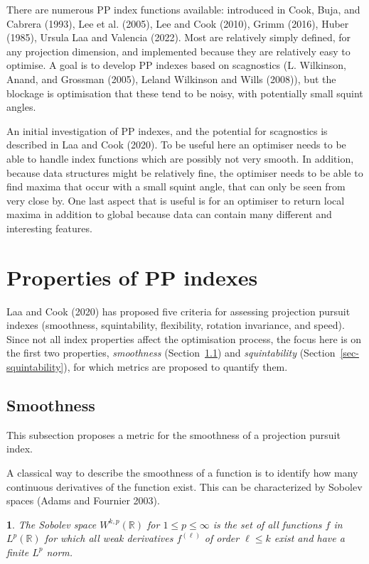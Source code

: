 \documentclass[
  12pt,
]{interact}
\theoremstyle{plain}
\newtheorem{defn}{\protect\definitionname}
\providecommand{\definitionname}{Definition}
\begin{document}
There are numerous PP index functions available: introduced in Cook,
Buja, and Cabrera (1993), Lee et al. (2005), Lee and Cook (2010), Grimm
(2016), Huber (1985), Ursula Laa and Valencia (2022). Most are
relatively simply defined, for any projection dimension, and implemented
because they are relatively easy to optimise. A goal is to develop PP
indexes based on scagnostics (L. Wilkinson, Anand, and Grossman (2005),
Leland Wilkinson and Wills (2008)), but the blockage is optimisation
that these tend to be noisy, with potentially small squint angles.

An initial investigation of PP indexes, and the potential for
scagnostics is described in Laa and Cook (2020). To be useful here an
optimiser needs to be able to handle index functions which are possibly
not very smooth. In addition, because data structures might be
relatively fine, the optimiser needs to be able to find maxima that
occur with a small squint angle, that can only be seen from very close
by. One last aspect that is useful is for an optimiser to return local
maxima in addition to global because data can contain many different and
interesting features.

\section{Properties of PP indexes}\label{sec-PP-properties}

Laa and Cook (2020) has proposed five criteria for assessing projection
pursuit indexes (smoothness, squintability, flexibility, rotation
invariance, and speed). Since not all index properties affect the
optimisation process, the focus here is on the first two properties,
\emph{smoothness} (Section~\ref{sec-smoothness}) and
\emph{squintability} (Section~\ref{sec-squintability}), for which
metrics are proposed to quantify them.

\subsection{Smoothness}\label{sec-smoothness}

This subsection proposes a metric for the smoothness of a projection
pursuit index.

A classical way to describe the smoothness of a function is to identify
how many continuous derivatives of the function exist. This can be
characterized by Sobolev spaces (Adams and Fournier 2003).

\begin{defn}\label{def:sobolev_space}
The Sobolev space $W^{k,p}(\mathbb{R})$ for $1\leq p\leq \infty$ is the set of all functions $f$ in $L^p(\mathbb{R})$ for which all weak derivatives $f^{(\ell)}$ of order $\ell\leq k$ exist and have a finite $L^p$ norm.
\end{defn}
\end{document}
